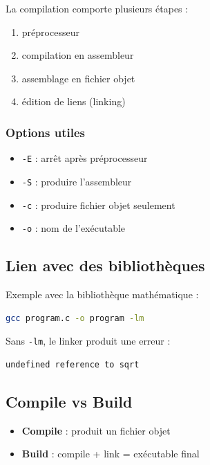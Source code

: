 La compilation comporte plusieurs étapes :

\begin{enumerate}
    \item préprocesseur
    \item compilation en assembleur
    \item assemblage en fichier objet
    \item édition de liens (linking)
\end{enumerate}

\subsubsection{Options utiles}

\begin{itemize}
    \item \texttt{-E} : arrêt après préprocesseur
    \item \texttt{-S} : produire l’assembleur
    \item \texttt{-c} : produire fichier objet seulement
    \item \texttt{-o} : nom de l’exécutable
\end{itemize}

\subsection{Lien avec des bibliothèques}

Exemple avec la bibliothèque mathématique :

\begin{lstlisting}[language=bash]
gcc program.c -o program -lm
\end{lstlisting}

Sans \texttt{-lm}, le linker produit une erreur :

\begin{lstlisting}
undefined reference to sqrt
\end{lstlisting}

\subsection{Compile vs Build}

\begin{itemize}
    \item \textbf{Compile} : produit un fichier objet
    \item \textbf{Build} : compile + link = exécutable final
\end{itemize}

